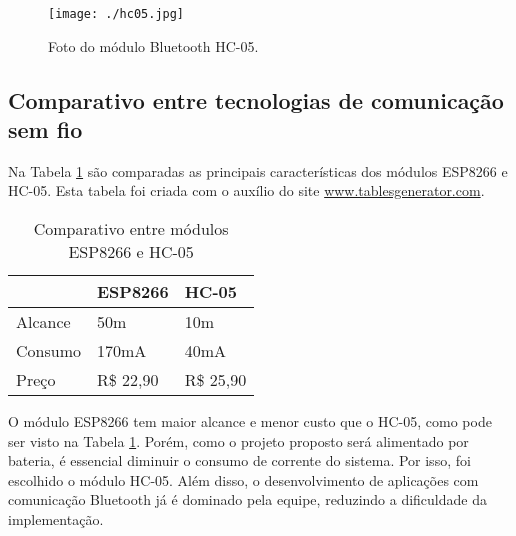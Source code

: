 \begin{figure}[!htb]
	\centering
	\texttt{[image: ./hc05.jpg]} 
	\caption{Foto do módulo Bluetooth HC-05.}
	\label{fig:hc05}
\end{figure}

\subsection{Comparativo entre tecnologias de comunicação sem fio}
Na Tabela \ref{tab:semfio} são comparadas as principais características dos módulos ESP8266 e HC-05. Esta tabela foi criada com o auxílio do site \url{www.tablesgenerator.com}.

\begin{table}[!htb]
\centering
\begin{tabular}{l|l|l}
    ~       & ESP8266   & HC-05      \\
    \hline
    Alcance & 50m       & 10m        \\
    \hline
    Consumo & 170mA     & 40mA       \\
    \hline
    Preço   & R\$ 22,90 & R\$ 25,90  \\
    \hline
\end{tabular}
\caption{Comparativo entre módulos ESP8266 e HC-05}
\label{tab:semfio}
\end{table}

O módulo ESP8266 tem maior alcance e menor custo que o HC-05, como pode ser visto na Tabela \ref{tab:semfio}. Porém, como o projeto proposto será alimentado por bateria, é essencial diminuir o consumo de corrente do sistema. Por isso, foi escolhido o módulo HC-05. Além disso, o desenvolvimento de aplicações com comunicação Bluetooth já é dominado pela equipe, reduzindo a dificuldade da implementação.



